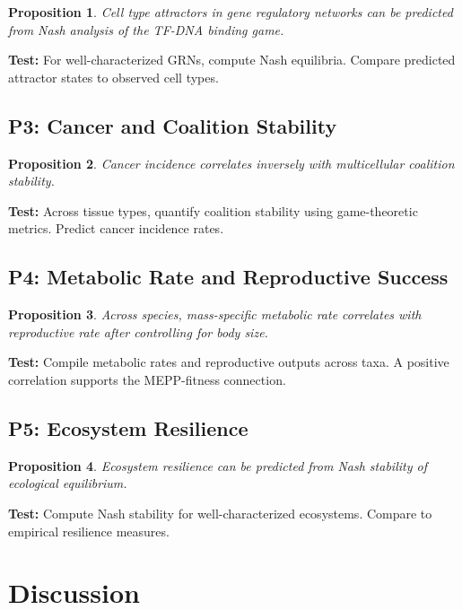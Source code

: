 \documentclass[12pt,a4paper]{article}
\newtheorem{proposition}{Proposition}
\theoremstyle{remark}
\begin{document}
\begin{proposition}
Cell type attractors in gene regulatory networks can be predicted from Nash analysis of the TF-DNA binding game.
\end{proposition}

\textbf{Test:} For well-characterized GRNs, compute Nash equilibria. Compare predicted attractor states to observed cell types.

\subsection{P3: Cancer and Coalition Stability}

\begin{proposition}
Cancer incidence correlates inversely with multicellular coalition stability.
\end{proposition}

\textbf{Test:} Across tissue types, quantify coalition stability using game-theoretic metrics. Predict cancer incidence rates.

\subsection{P4: Metabolic Rate and Reproductive Success}

\begin{proposition}
Across species, mass-specific metabolic rate correlates with reproductive rate after controlling for body size.
\end{proposition}

\textbf{Test:} Compile metabolic rates and reproductive outputs across taxa. A positive correlation supports the MEPP-fitness connection.

\subsection{P5: Ecosystem Resilience}

\begin{proposition}
Ecosystem resilience can be predicted from Nash stability of ecological equilibrium.
\end{proposition}

\textbf{Test:} Compute Nash stability for well-characterized ecosystems. Compare to empirical resilience measures.

\section{Discussion}
\label{sec:discussion}
\end{document}
